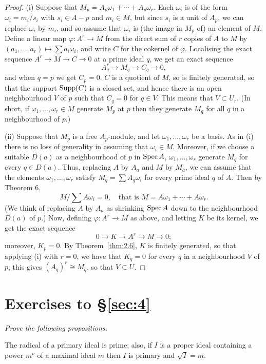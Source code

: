 \begin{proof}
(i) Suppose that $M_p = A_p\omega_1 + \cdots + A_p\omega_r$. Each $\omega_i$ is of the form
$\omega_i = m_i/s_i$ with $s_i \in A - p$ and $m_i \in M$, but since $s_i$ is a unit of $A_p$, we can
replace $\omega_i$ by $m_i$, and so assume that $\omega_i$ is (the image in $M_p$ of) an element
of $M$. Define a linear map $\varphi\colon A^r \to M$ from the direct sum of $r$ copies of
$A$ to $M$ by $(a_1, \ldots, a_r) \mapsto \sum a_i\omega_i$, and write $C$ for the cokernel of $\varphi$. Localising
the exact sequence $A^r \to M \to C \to 0$ at a prime ideal $q$, we get an
exact sequence
\[
  A_q^r \to M_q \to C_q \to 0,
\]
and when $q = p$ we get $C_p = 0$. $C$ is a quotient of $M$, so is finitely generated,
so that the support $\operatorname{Supp}(C)$ is a closed set, and hence there is an open
neighbourhood $V$ of $p$ such that $C_q = 0$ for $q \in V$. This means that $V \subset U_r$.
(In short, if $\omega_1, \ldots, \omega_r \in M$ generate $M_p$ at $p$ then they generate $M_q$ for all $q$
in a neighbourhood of $p$.)

(ii) Suppose that $M_p$ is a free $A_p$-module, and let $\omega_1, \ldots, \omega_r$ be a basis.
As in (i) there is no loss of generality in assuming that $\omega_i \in M$. Moreover,
if we choose a suitable $D(a)$ as a neighbourhood of $p$ in $\operatorname{Spec} A$, $\omega_1, \ldots, \omega_r$
generate $M_q$ for every $q \in D(a)$. Thus, replacing $A$ by $A_a$ and $M$ by $M_a$,
we can assume that the elements $\omega_1, \ldots, \omega_r$ satisfy $M_q = \sum A_q\omega_i$ for every
prime ideal $q$ of $A$. Then by Theorem 6,
\[
  M/\sum A\omega_i = 0, \quad \text{that is } M = A\omega_1 + \cdots + A\omega_r.
\]
(We think of replacing $A$ by $A_a$ as shrinking $\operatorname{Spec} A$ down to the
neighbourhood $D(a)$ of $p$.) Now, defining $\varphi\colon A^r \to M$ as above, and letting
$K$ be its kernel, we get the exact sequence
\[
  0 \to K \to A^r \to M \to 0;
\]
moreover, $K_p = 0$. By Theorem~\ref{thm:2.6}, $K$ is finitely generated, so that applying
(i) with $r = 0$, we have that $K_q = 0$ for every $q$ in a neighbourhood $V$ of
$p$; this gives $(A_q)^r \cong M_q$, so that $V \subset U$.
\end{proof}

\section*{Exercises to \S\ref{sec:4}}
\emph{Prove the following propositions.}

\begin{exercise}\label{ex:4.1-ex}
The radical of a primary ideal is prime; also, if $I$ is a proper ideal containing
a power $m^\nu$ of a maximal ideal $m$ then $I$ is primary and $\sqrt{I} = m$.
\end{exercise}

